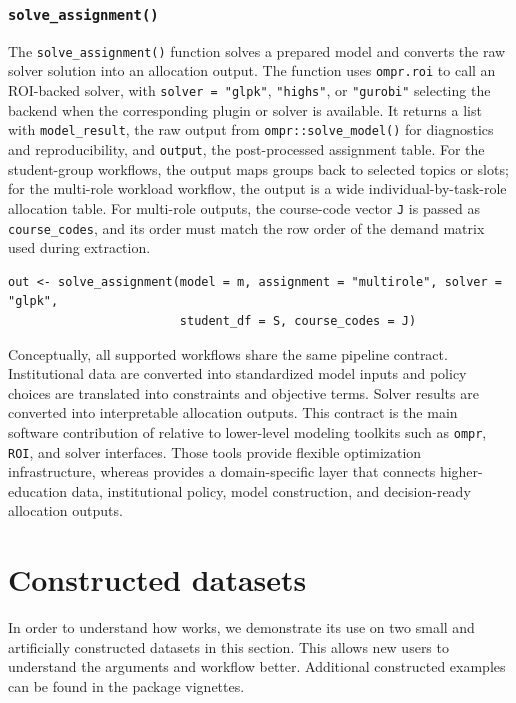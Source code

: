 \subsubsection{\texorpdfstring{\texttt{solve\_assignment()}}{solve\_assignment()}}\label{solve_assignment}

The \texttt{solve\_assignment()} function solves a prepared model and converts the raw
solver solution into an allocation output. The function uses \texttt{ompr.roi} to call
an ROI-backed solver, with \texttt{solver\ =\ "glpk"}, \texttt{"highs"}, or \texttt{"gurobi"} selecting
the backend when the corresponding plugin or solver is available. It returns a
list with \texttt{model\_result}, the raw output from \texttt{ompr::solve\_model()} for
diagnostics and reproducibility, and \texttt{output}, the post-processed assignment
table. For the student-group workflows, the output maps groups back to selected
topics or slots; for the multi-role workload workflow, the output is a wide
individual-by-task-role allocation table. For multi-role outputs, the
course-code vector \texttt{J} is passed as \texttt{course\_codes}, and its order must match the
row order of the demand matrix used during extraction.

\begin{verbatim}
out <- solve_assignment(model = m, assignment = "multirole", solver = "glpk",
                        student_df = S, course_codes = J)
\end{verbatim}

Conceptually, all supported workflows share the same pipeline contract.
Institutional data are converted into standardized model inputs and policy
choices are translated into constraints and objective terms. Solver results are
converted into interpretable allocation outputs. This contract is the main
software contribution of  relative to lower-level modeling toolkits
such as \texttt{ompr}, \texttt{ROI}, and solver interfaces. Those tools provide flexible
optimization infrastructure, whereas  provides a domain-specific layer
that connects higher-education data, institutional policy, model construction,
and decision-ready allocation outputs.

\section{Constructed datasets}\label{sec-constructed-data}

In order to understand how  works, we demonstrate its use on
two small and artificially constructed datasets in this section. This allows
new users to understand the arguments and workflow better. Additional
constructed examples can be found in the package vignettes.

